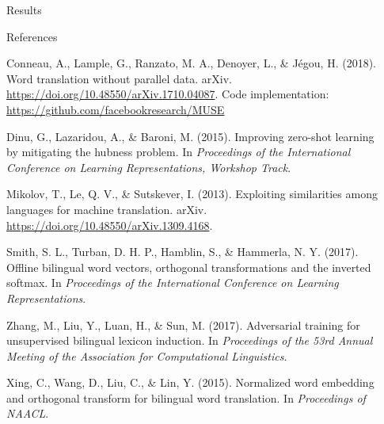 \documentclass[final]{beamer}
\newlength{\sepwid}
\newlength{\onecolwid}
\begin{document}
\begin{frame}[t]
\begin{columns}[t]
\begin{column}{\onecolwid}
\begin{block}{Results}
\begin{table}[ht]
{}
\caption{English to Italian (1), Italian to English (2) word translation retrieval performance (P@1, P@5, P@10) for various methods with and without cross-lingual supervision, evaluated using P@k from 2,000 source queries and 200,000 target sentences. Embeddings from Smith et al. (2017). Results marked by † are theirs. Table 3, p. 8.}
\end{table}
\vspace{-1.8cm}

\end{block}

\begin{block}{References}
\vspace{-0.25cm}
\begin{itemize}
{\fontsize{17.5}{23.5}\selectfont
\setlength{\itemsep}{-2mm} 
\item Conneau, A., Lample, G., Ranzato, M. A., Denoyer, L., \& Jégou, H. (2018). Word translation without parallel data. arXiv. \url{https://doi.org/10.48550/arXiv.1710.04087}. Code implementation: \url{https://github.com/facebookresearch/MUSE}
\item Dinu, G., Lazaridou, A., \& Baroni, M. (2015). Improving zero-shot learning by mitigating the hubness problem. In \textit{Proceedings of the International Conference on Learning Representations, Workshop Track}.
\item Mikolov, T., Le, Q. V., \& Sutskever, I. (2013). Exploiting similarities among languages for machine translation. arXiv. \url{https://doi.org/10.48550/arXiv.1309.4168}.
\item Smith, S. L., Turban, D. H. P., Hamblin, S., \& Hammerla, N. Y. (2017). Offline bilingual word vectors, orthogonal transformations and the inverted softmax. In \textit{Proceedings of the International Conference on Learning Representations}.
\item Zhang, M., Liu, Y., Luan, H., \& Sun, M. (2017). Adversarial training for unsupervised bilingual lexicon induction. In \textit{Proceedings of the 53rd Annual Meeting of the Association for Computational Linguistics}.
\item Xing, C., Wang, D., Liu, C., \& Lin, Y. (2015). Normalized word embedding and orthogonal transform for bilingual word translation. In \textit{Proceedings of NAACL}.}
\end{itemize}
\end{block}






\end{column}

\begin{column}{\sepwid}\end{column}

\end{columns}
\end{frame}
\end{document}
